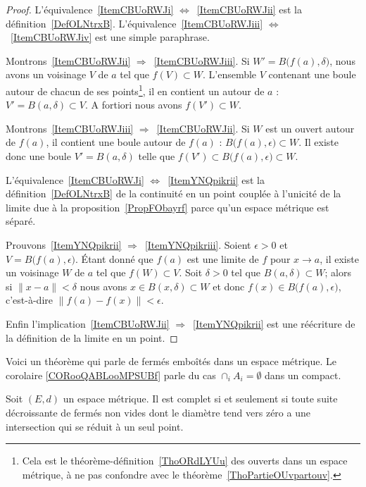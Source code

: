 \begin{proof}
    L'équivalence~\ref{ItemCBUoRWJi} \( \Leftrightarrow\)~\ref{ItemCBUoRWJii} est la définition~\ref{DefOLNtrxB}. L'équivalence~\ref{ItemCBUoRWJiii} \( \Leftrightarrow\)~\ref{ItemCBUoRWJiv} est une simple paraphrase.

    Montrons~\ref{ItemCBUoRWJii} \( \Rightarrow\)~\ref{ItemCBUoRWJiii}. Si \( W'=B\big( f(a),\delta \big)\), nous avons un voisinage \( V\) de \( a\) tel que \( f(V)\subset W\). L'ensemble \( V\) contenant une boule autour de chacun de ses points\footnote{Cela est le théorème-définition~\ref{ThoORdLYUu} des ouverts dans un espace métrique, à ne pas confondre avec le théorème~\ref{ThoPartieOUvpartouv}.}, il en contient un autour de \( a\) : \( V'=B(a,\delta)\subset V\). A fortiori nous avons \( f(V')\subset W\).

    Montrons~\ref{ItemCBUoRWJiii} \( \Rightarrow\)~\ref{ItemCBUoRWJii}. Si \( W\) est un ouvert autour de \( f(a)\), il contient une boule autour de \( f(a)\) : \( B\big( f(a),\epsilon \big)\subset W\). Il existe donc une boule \( V'=B(a,\delta)\) telle que \( f(V')\subset B\big( f(a),\epsilon \big)\subset W\).

    L'équivalence~\ref{ItemCBUoRWJi} \( \Leftrightarrow\)~\ref{ItemYNQpikrii} est la définition~\ref{DefOLNtrxB} de la continuité en un point couplée à l'unicité de la limite due à la proposition~\ref{PropFObayrf} parce qu'un espace métrique est séparé.

    Prouvons~\ref{ItemYNQpikrii} \( \Rightarrow\)~\ref{ItemYNQpikriii}. Soient \( \epsilon>0\) et \( V=B\big( f(a),\epsilon \big)\). Étant donné que \( f(a)\) est une limite de \( f\) pour \( x\to a\), il existe un voisinage \( W\) de \( a\) tel que \( f(W)\subset V\). Soit \( \delta>0\) tel que \( B(a,\delta)\subset W\); alors si \( \| x-a \|<\delta\) nous avons \( x\in B(x,\delta)\subset W\) et donc \( f(x)\in B\big( f(a),\epsilon \big)\), c'est-à-dire \( \| f(a)-f(x) \|<\epsilon\).

    Enfin l'implication~\ref{ItemCBUoRWJii} \( \Rightarrow\)~\ref{ItemYNQpikrii} est une réécriture de la définition de la limite en un point.
\end{proof}

Voici un théorème qui parle de fermés emboîtés dans un espace métrique. Le corolaire \ref{CORooQABLooMPSUBf} parle du cas \( \cap_iA_i=\emptyset\) dans un compact.
\begin{theorem}   \label{ThoCQAcZxX}
    Soit \( (E,d)\) un espace métrique. Il est complet si et seulement si toute suite décroissante de fermés non vides dont le diamètre tend vers zéro a une intersection qui se réduit à un seul point.
\end{theorem}

